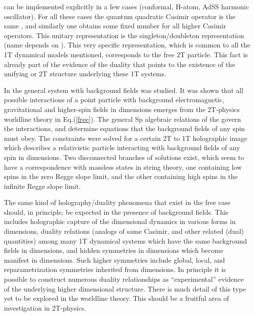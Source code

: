 \documentclass[a4paper,12pt]{article}
\begin{document}
can be implemented explicitly in a few cases (conformal, H-atom,
AdS\coordHE{}S\coordHE{} harmonic oscillator). For all these
cases the quantum quadratic Casimir operator is the same
\coordHE{}, and
similarly one obtains some fixed number for all higher Casimir
operators. This unitary representation is the singleton/doubleton
representation (name depends on \coordHE{}). This very specific
representation, which is common to all the 1T dynamical models
mentioned, corresponds to the free 2T particle. This fact is
already part of the evidence of the duality that points to the
existence of the unifying \coordHE{} or 2T structure underlying these
1T systems.

In \cite{highspin} the general system with background fields was
studied. It was shown that all possible interactions of a point
particle with background electromagnetic, gravitational and
higher-spin fields in \coordHE{} dimensions emerges from the 2T-physics
worldline theory in Eq.(\ref{free}). The general Sp\coordHE{}
algebraic relations of the \coordHE{} govern the
interactions, and determine equations that the background fields
of any spin must obey. The constraints were solved for a certain
2T to 1T holographic image which describes a relativistic particle
interacting with background fields of any spin in \coordHE{}
dimensions. Two disconnected branches of solutions exist, which
seem to have a correspondence with massless states in string
theory, one containing low spins in the zero Regge slope limit,
and the other containing high spins in the infinite Regge slope
limit.

The same kind of holography/duality phenomena that exist in the free case
should, in principle, be expected in the presence of background fields. This
includes holographic capture of the \coordHE{} dimensional dynamics in various
forms in \coordHE{} dimensions, duality relations (analogs of same Casimir, and
other related (dual) quantities) among many 1T dynamical systems which have
the same background fields in \coordHE{} dimensions, and hidden symmetries in \coordHE{}
dimensions which become manifest in \coordHE{} dimensions. Such higher symmetries
include global, local, and reparametrization symmetries inherited from \coordHE{}
dimensions. In principle it is possible to construct numerous duality
relationships as ``experimental'' evidence of the underlying higher
dimensional structure. There is much detail of this type yet to be explored
in the worldline theory. This should be a fruitful area of investigation in
2T-physics.
\end{document}
